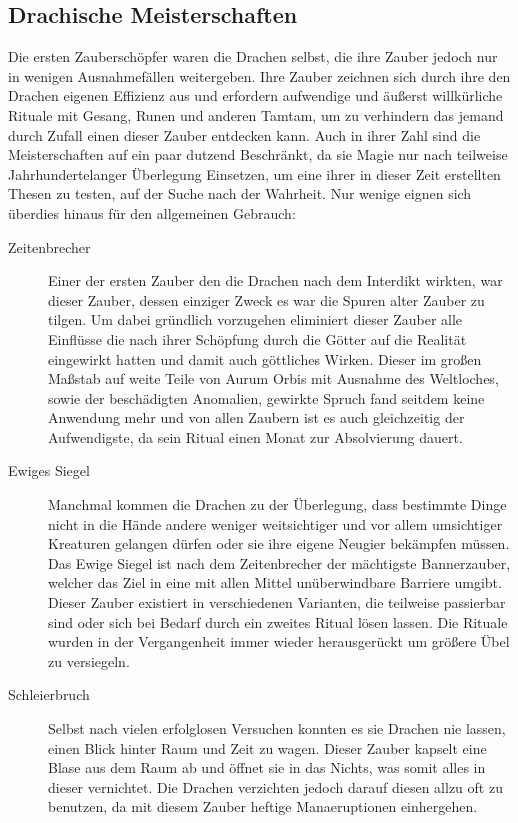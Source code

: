 \documentclass[a4paper,12pt,oneside]{book}
\begin{document}
\subsection{Drachische Meisterschaften}
Die ersten Zauberschöpfer waren die Drachen selbst, die ihre Zauber jedoch nur in wenigen Ausnahmefällen weitergeben. Ihre Zauber zeichnen sich durch ihre den Drachen eigenen Effizienz aus und erfordern aufwendige und äußerst willkürliche Rituale mit Gesang, Runen und anderen Tamtam, um zu verhindern das jemand durch Zufall einen dieser Zauber entdecken kann. Auch in ihrer Zahl sind die Meisterschaften auf ein paar dutzend Beschränkt, da sie Magie nur nach teilweise Jahrhundertelanger Überlegung Einsetzen, um eine ihrer in dieser Zeit erstellten Thesen zu testen, auf der Suche nach der Wahrheit. Nur wenige eignen sich überdies hinaus für den allgemeinen Gebrauch:
\begin{description}
\item[Zeitenbrecher]Einer der ersten Zauber den die Drachen nach dem Interdikt wirkten, war dieser Zauber, dessen einziger Zweck es war die Spuren alter Zauber zu tilgen. Um dabei gründlich vorzugehen eliminiert dieser Zauber alle Einflüsse die nach ihrer Schöpfung durch die Götter auf die Realität eingewirkt hatten und damit auch göttliches Wirken. Dieser im großen Maßstab auf weite Teile von Aurum Orbis mit Ausnahme des Weltloches, sowie der beschädigten Anomalien, gewirkte Spruch fand seitdem keine Anwendung mehr und von allen Zaubern ist es auch gleichzeitig der Aufwendigste, da sein Ritual einen Monat zur Absolvierung dauert.
\item[Ewiges Siegel]Manchmal kommen die Drachen zu der Überlegung, dass bestimmte Dinge nicht in die Hände andere weniger weitsichtiger und vor allem umsichtiger Kreaturen gelangen dürfen oder sie ihre eigene Neugier bekämpfen müssen. Das Ewige Siegel ist nach dem Zeitenbrecher der mächtigste Bannerzauber, welcher das Ziel in eine mit allen Mittel unüberwindbare Barriere umgibt. Dieser Zauber existiert in verschiedenen Varianten, die teilweise passierbar sind oder sich bei Bedarf durch ein zweites Ritual lösen lassen. Die Rituale wurden in der Vergangenheit immer wieder herausgerückt um größere Übel zu versiegeln.
\item[Schleierbruch]Selbst nach vielen erfolglosen Versuchen konnten es sie Drachen nie lassen, einen Blick hinter Raum und Zeit zu wagen. Dieser Zauber kapselt eine Blase aus dem Raum ab und öffnet sie in das Nichts, was somit alles in dieser vernichtet. Die Drachen verzichten jedoch darauf diesen allzu oft zu benutzen, da mit diesem Zauber heftige Manaeruptionen einhergehen.
\end{description}
\end{document}
